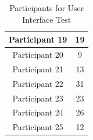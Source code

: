 \begin{table}[htbp]
\begin{tabular}{|c|c|}
    Participant 19             & 19                                \\ \hline
    Participant 20             & 9                                \\ \hline
    Participant 21             & 13                                \\ \hline
    Participant 22             & 31                                \\ \hline
    Participant 23             & 23                                \\ \hline
    Participant 24             & 26                                \\ \hline
    Participant 25             & 12                                \\ \hline
    \end{tabular}
    \caption{Participants for User Interface Test}
    \label{fig:heatmapTimes}
    \end{table}



